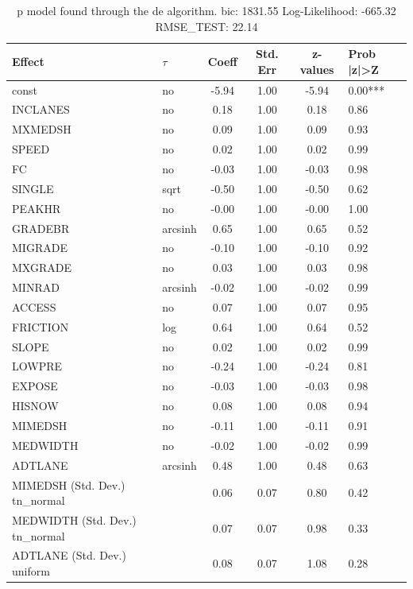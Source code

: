 \begin{table}
	\caption{p model found through the de algorithm. bic: 1831.55 Log-Likelihood: -665.32 RMSE_TEST: 22.14}
	\begin{center}
		\begin{tabular}{|l|l|c|c|c|l|}
			\hline
			Effect & $\tau$ & Coeff & Std. Err & z-values & Prob |z|>Z \\
			\hline
			const & no & -5.94 & 1.00 & -5.94 & 0.00*** \\
			\hline
			INCLANES & no & 0.18 & 1.00 & 0.18 & 0.86 \\
			\hline
			MXMEDSH & no & 0.09 & 1.00 & 0.09 & 0.93 \\
			\hline
			SPEED & no & 0.02 & 1.00 & 0.02 & 0.99 \\
			\hline
			FC & no & -0.03 & 1.00 & -0.03 & 0.98 \\
			\hline
			SINGLE & sqrt & -0.50 & 1.00 & -0.50 & 0.62 \\
			\hline
			PEAKHR & no & -0.00 & 1.00 & -0.00 & 1.00 \\
			\hline
			GRADEBR & arcsinh & 0.65 & 1.00 & 0.65 & 0.52 \\
			\hline
			MIGRADE & no & -0.10 & 1.00 & -0.10 & 0.92 \\
			\hline
			MXGRADE & no & 0.03 & 1.00 & 0.03 & 0.98 \\
			\hline
			MINRAD & arcsinh & -0.02 & 1.00 & -0.02 & 0.99 \\
			\hline
			ACCESS & no & 0.07 & 1.00 & 0.07 & 0.95 \\
			\hline
			FRICTION & log & 0.64 & 1.00 & 0.64 & 0.52 \\
			\hline
			SLOPE & no & 0.02 & 1.00 & 0.02 & 0.99 \\
			\hline
			LOWPRE & no & -0.24 & 1.00 & -0.24 & 0.81 \\
			\hline
			EXPOSE & no & -0.03 & 1.00 & -0.03 & 0.98 \\
			\hline
			HISNOW & no & 0.08 & 1.00 & 0.08 & 0.94 \\
			\hline
			MIMEDSH & no & -0.11 & 1.00 & -0.11 & 0.91 \\
			\hline
			MEDWIDTH & no & -0.02 & 1.00 & -0.02 & 0.99 \\
			\hline
			ADTLANE & arcsinh & 0.48 & 1.00 & 0.48 & 0.63 \\
			\hline
			MIMEDSH (Std. Dev.) tn_normal &  & 0.06 & 0.07 & 0.80 & 0.42 \\
			\hline
			MEDWIDTH (Std. Dev.) tn_normal &  & 0.07 & 0.07 & 0.98 & 0.33 \\
			\hline
			ADTLANE (Std. Dev.) uniform &  & 0.08 & 0.07 & 1.08 & 0.28 \\
			\hline
		\end{tabular}
	\end{center}
\end{table}